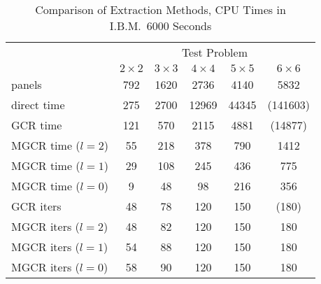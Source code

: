 
\begin{table}
\begin{center}
\begin{tabular}{|l|c|c|c|c|c|}\hline\hline
&\multicolumn{5}{|c|}{Test Problem}\\\cline{2-6}
& $ 2 \times 2 $ & $ 3 \times 3 $ & $ 4 \times 4 $ & $ 5 \times 5 $ & $ 6 \times 6 $\\\hline\hline
panels & 792 & 1620 & 2736 & 4140 & 5832\\\hline
%
%
direct time & 275 & 2700 & 12969 & 44345 & (141603)\\
GCR time & 121 & 570 & 2115 & 4881 & (14877)\\
MGCR time ($l=2$) & 55 & 218 & 378 & 790 & 1412\\
MGCR time ($l=1$) & 29 & 108 & 245 & 436 & 775\\
MGCR time ($l=0$) & 9 & 48 & 98 & 216 & 356\\
\hline
GCR iters & 48 & 78 & 120 & 150 & (180)\\
MGCR iters ($l=2$) & 48 & 82 & 120 & 150 & 180\\
MGCR iters ($l=1$) & 54 & 88 & 120 & 150 & 180\\
MGCR iters ($l=0$) & 58 & 90 & 120 & 150 & 180\\\hline
%
\end{tabular}
\end{center}
\caption{Comparison of Extraction Methods, CPU Times in I.B.M.\ 6000 Seconds}
\label{times}
\end{table}

